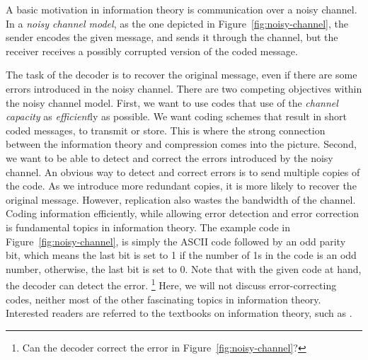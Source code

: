 A basic motivation in information theory is communication over 
a noisy channel.
In a \emph{noisy channel model},
as the one depicted in Figure~\ref{fig:noisy-channel},
the sender encodes the given message,
and sends it through the channel,
but the receiver receives a possibly corrupted version of the coded message.
\begin{marginfigure}
  \caption{\label{fig:noisy-channel}%
    Schematic description of the noisy-channel model.
    The encoder codes the message and sends through a noisy channel
    to the decoder.
    The encoded message may possibly be corrupted during the transmission.
    The decoder's task is to reconstruct the original message,
    despite the potential noise introduced.
  }
\end{marginfigure}
The task of the decoder is to recover the original message,
even if there are some errors introduced in the noisy channel.
There are two competing objectives within the noisy channel model.
First, we want to use codes that use of the \emph{channel capacity}
as \emph{efficient}ly as possible.
We want coding schemes that result in short coded messages,
to transmit or store.
This is where the strong connection between the information theory 
and compression comes into the picture.
Second,
we want to be able to detect and correct the errors introduced by the noisy channel.
An obvious way to detect and correct errors is 
to send multiple copies of the code.
As we introduce more redundant copies,
it is more likely to recover the original message.
However,
replication also wastes the bandwidth of the channel.
Coding information efficiently,
while allowing error detection and error correction is fundamental
topics in information theory.
The example code in Figure~\ref{fig:noisy-channel},
is simply the ASCII code followed by an odd parity bit,
which means the last bit is set to \num{1} if the number of \num{1}s
in the code is an odd number,
otherwise,
the last bit is set to \num{0}.
Note that with the given code at hand,
the decoder can detect the error.%
\footnote{Can the decoder correct the error in Figure~\ref{fig:noisy-channel}?}
Here, we will not discuss error-correcting codes,
neither most of the other fascinating topics in information theory.
Interested readers are referred to the textbooks on information theory,
such as \textcite{mackay2003}.

